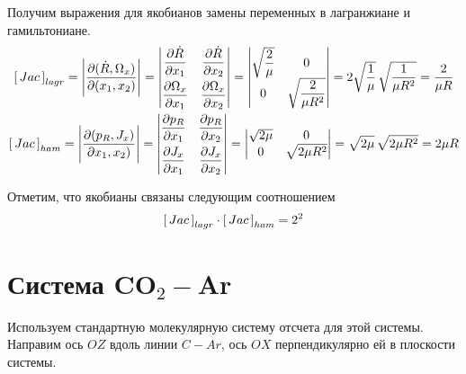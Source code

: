 \documentclass[12pt]{article}
\newcommand{\dR}{\dot{R}}
\newcommand{\JacL}{\left[ \, Jac \, \right]_{lagr}}
\newcommand{\JacH}{\left[ \, Jac \, \right]_{ham}}
\begin{document}
Получим выражения для якобианов замены переменных в лагранжиане и гамильтониане. 
\begin{gather}
		\left[ \, Jac \, \right]_{lagr} = \Bigg{|} \frac{\partial ( \dR, \Omega_x )}{\partial ( x_1, x_2 )} \Bigg{|}  =  
	\begin{vmatrix}
			\displaystyle \frac{\partial \dR}{\partial x_1} & \displaystyle \frac{\partial \dR}{\partial x_2} \\[2ex]
		\displaystyle \frac{\partial \Omega_x}{\partial x_1} & \displaystyle \frac{\partial \Omega_x}{\partial x_2}
\end{vmatrix} =
\begin{vmatrix}
		\displaystyle \sqrt{\frac{2}{\mu}} & 0 \\
	0 & \displaystyle \sqrt{\frac{2}{\mu R^2}}
\end{vmatrix} = 2 \sqrt{\frac{1}{\mu}} \, \sqrt{\frac{1}{\mu R^2}} = \frac{2}{\mu R} \notag \\
\left[ \, Jac \, \right]_{ham} = \Bigg{|} \frac{\partial ( p_R, J_x )}{\partial x_1, x_2 )} \Bigg{|} = 
\begin{vmatrix}
		\displaystyle \frac{\partial p_R}{\partial x_1} & \displaystyle \frac{\partial p_R}{\partial x_2} \\[2ex]
	\displaystyle \frac{\partial J_x}{\partial x_1} & \displaystyle \frac{\partial J_x}{\partial x_2}
\end{vmatrix} =
\begin{vmatrix}
	\sqrt{2 \mu} & 0 \\
	0 & \sqrt{2 \mu R^2}
\end{vmatrix} = \sqrt{2 \mu} \, \sqrt{2 \mu R^2} = 2 \mu R \notag
\end{gather}

Отметим, что якобианы связаны следующим соотношением
\begin{gather}
	\JacL \cdot \JacH = 2^2 \notag	
\end{gather}

\section{Система CO$_2-$Ar}

Используем стандартную молекулярную систему отсчета для этой системы. Направим ось $OZ$ вдоль линии $C-Ar$, ось $OX$ перпендикулярно ей в плоскости системы. 
\end{document}
